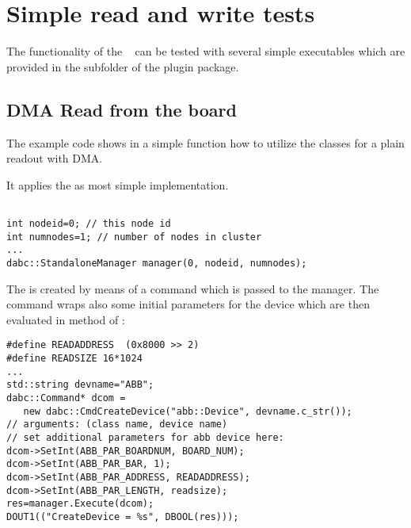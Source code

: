 \section{Simple read and write tests}
\label{prog_exapci_simpletest}
The functionality of the \ABB~ can be tested with several simple
executables which are provided in the  subfolder of the
 plugin package.

\subsection{DMA Read from the board}
\label{prog_exapci_simpletest_read}
The example code  shows in a
simple  function how to utilize the
 classes 
for a plain readout with DMA.
\begin{compactenum} 

\item It applies the  as most simple
 implementation.
\begin{small}
\begin{verbatim}

int nodeid=0; // this node id
int numnodes=1; // number of nodes in cluster
...
dabc::StandaloneManager manager(0, nodeid, numnodes);
\end{verbatim}
\end{small}

\item The  is created by means of a command
 which is passed to the manager. The 
command wraps also some initial
parameters for the device which are then evaluated in 
method  of :

\begin{small}
\begin{verbatim}
#define READADDRESS  (0x8000 >> 2)
#define READSIZE 16*1024
...
std::string devname="ABB";
dabc::Command* dcom = 
   new dabc::CmdCreateDevice("abb::Device", devname.c_str());
// arguments: (class name, device name)
// set additional parameters for abb device here:
dcom->SetInt(ABB_PAR_BOARDNUM, BOARD_NUM);
dcom->SetInt(ABB_PAR_BAR, 1);
dcom->SetInt(ABB_PAR_ADDRESS, READADDRESS);
dcom->SetInt(ABB_PAR_LENGTH, readsize);
res=manager.Execute(dcom);
DOUT1(("CreateDevice = %s", DBOOL(res)));
\end{verbatim}
\end{small}


\end{compactenum}
